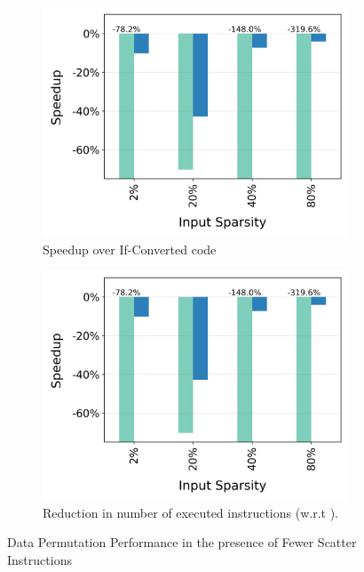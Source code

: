 \begin{figure}[t]
\begin{subfigure}{.499\textwidth}
    \includegraphics[width=\textwidth]{Figures/Evaluations/chart.png}
    \caption{Speedup over If-Converted code}
    \label{fig:if-then-else-few-scatter-xppedup-over-ifConv}
  \end{subfigure}
  \begin{subfigure}{.499\textwidth}
    \centering
    \includegraphics[width=\textwidth]{Figures/Evaluations/chart.png}
    \caption{Reduction in number of executed instructions (w.r.t \scalar).}
    \label{fig:if-then-else-few-scatter-inst}
  \end{subfigure}%
  
  \caption{Data Permutation Performance in the presence of Fewer Scatter Instructions}
  \label{fig:if-then-else-few-scatter}
\end{figure}

\fi